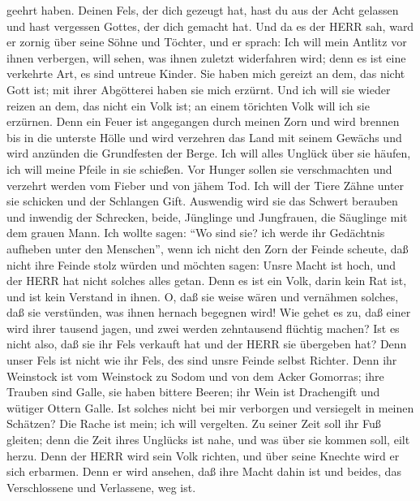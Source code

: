 geehrt haben.  Deinen Fels, der dich gezeugt hat, hast du
aus der Acht gelassen und hast vergessen Gottes, der dich gemacht hat.
 Und da es der HERR sah, ward er zornig über seine Söhne
und Töchter,  und er sprach: Ich will mein Antlitz vor
ihnen verbergen, will sehen, was ihnen zuletzt widerfahren wird; denn es
ist eine verkehrte Art, es sind untreue Kinder.  Sie haben
mich gereizt an dem, das nicht Gott ist; mit ihrer Abgötterei haben sie
mich erzürnt. Und ich will sie wieder reizen an dem, das nicht ein Volk
ist; an einem törichten Volk will ich sie erzürnen.  Denn
ein Feuer ist angegangen durch meinen Zorn und wird brennen bis in die
unterste Hölle und wird verzehren das Land mit seinem Gewächs und wird
anzünden die Grundfesten der Berge.  Ich will alles Unglück
über sie häufen, ich will meine Pfeile in sie schießen. 
Vor Hunger sollen sie verschmachten und verzehrt werden vom Fieber und
von jähem Tod. Ich will der Tiere Zähne unter sie schicken und der
Schlangen Gift.  Auswendig wird sie das Schwert berauben
und inwendig der Schrecken, beide, Jünglinge und Jungfrauen, die
Säuglinge mit dem grauen Mann.  Ich wollte sagen: ``Wo sind
sie? ich werde ihr Gedächtnis aufheben unter den Menschen'',
 wenn ich nicht den Zorn der Feinde scheute, daß nicht ihre
Feinde stolz würden und möchten sagen: Unsre Macht ist hoch, und der
HERR hat nicht solches alles getan.  Denn es ist ein Volk,
darin kein Rat ist, und ist kein Verstand in ihnen.  O, daß
sie weise wären und vernähmen solches, daß sie verstünden, was ihnen
hernach begegnen wird!  Wie gehet es zu, daß einer wird
ihrer tausend jagen, und zwei werden zehntausend flüchtig machen? Ist es
nicht also, daß sie ihr Fels verkauft hat und der HERR sie übergeben
hat?  Denn unser Fels ist nicht wie ihr Fels, des sind
unsre Feinde selbst Richter.  Denn ihr Weinstock ist vom
Weinstock zu Sodom und von dem Acker Gomorras; ihre Trauben sind Galle,
sie haben bittere Beeren;  ihr Wein ist Drachengift und
wütiger Ottern Galle.  Ist solches nicht bei mir verborgen
und versiegelt in meinen Schätzen?  Die Rache ist mein; ich
will vergelten. Zu seiner Zeit soll ihr Fuß gleiten; denn die Zeit ihres
Unglücks ist nahe, und was über sie kommen soll, eilt herzu.
 Denn der HERR wird sein Volk richten, und über seine
Knechte wird er sich erbarmen. Denn er wird ansehen, daß ihre Macht
dahin ist und beides, das Verschlossene und Verlassene, weg ist.
